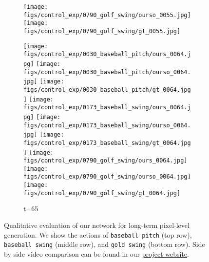 \documentclass{article}
\begin{document}
\begin{appendix}
\begin{figure*}[!thbp]
\begin{subfigure}{0.12\linewidth}
  		\texttt{[image: figs/control\_exp/0790\_golf\_swing/ourso\_0055.jpg]}
  		\vspace{.2cm}
  		\texttt{[image: figs/control\_exp/0790\_golf\_swing/gt\_0055.jpg]}
	\end{subfigure}
	\begin{subfigure}{0.12\linewidth}
        \caption*{t=65}
        \vspace{-7pt}
	    \texttt{[image: figs/control\_exp/0030\_baseball\_pitch/ours\_0064.jpg]}
	    \texttt{[image: figs/control\_exp/0030\_baseball\_pitch/ourso\_0064.jpg]}
	    \vspace{.2cm}
  		\texttt{[image: figs/control\_exp/0030\_baseball\_pitch/gt\_0064.jpg]}
  		\texttt{[image: figs/control\_exp/0173\_baseball\_swing/ours\_0064.jpg]}
  		\texttt{[image: figs/control\_exp/0173\_baseball\_swing/ourso\_0064.jpg]}
  		\vspace{.2cm}
  		\texttt{[image: figs/control\_exp/0173\_baseball\_swing/gt\_0064.jpg]}
  		\texttt{[image: figs/control\_exp/0790\_golf\_swing/ours\_0064.jpg]}
  		\texttt{[image: figs/control\_exp/0790\_golf\_swing/ourso\_0064.jpg]}
  		\vspace{.2cm}
  		\texttt{[image: figs/control\_exp/0790\_golf\_swing/gt\_0064.jpg]}
	\end{subfigure}
    \caption{Qualitative evaluation of our network for long-term pixel-level generation. We show the actions of \texttt{baseball pitch} (top row), \texttt{baseball swing} (middle row), and \texttt{gold swing} (bottom row). Side by side video comparison can be found in our \href{https://goo.gl/U7UOfy}{project website}.}
\label{fig:penngtft}
\vspace{-40pt}
\end{figure*}
\clearpage


\end{appendix}
\end{document}
